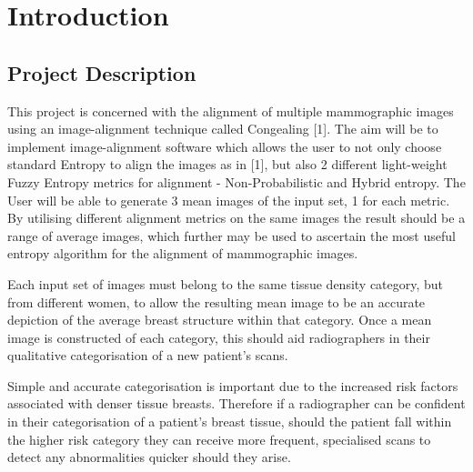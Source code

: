 \chapter{Introduction}

\section{Project Description}
This project is concerned with the alignment of multiple mammographic images using an image-alignment technique called Congealing [1]. The aim will be to implement image-alignment software which allows the user to not only choose standard Entropy to align the images as in [1], but also 2 different light-weight Fuzzy Entropy metrics for alignment - Non-Probabilistic and Hybrid entropy. The User will be able to generate 3 mean images of the input set, 1 for each metric. By utilising different alignment metrics on the same images the result should be a range of average images, which further may be used to ascertain the most useful entropy algorithm for the alignment of mammographic images.

Each input set of images must belong to the same tissue density category, but from different women, to allow the resulting mean image to be an accurate depiction of the average breast structure within that category. Once a mean image is constructed of each category, this should aid radiographers in their qualitative categorisation of a new patient's scans.

Simple and accurate categorisation is important due to the increased risk factors associated with denser tissue breasts. Therefore if a radiographer can be confident in their categorisation of a patient's breast tissue, should the patient fall within the higher risk category they can receive more frequent, specialised scans to detect any abnormalities quicker should they arise.
